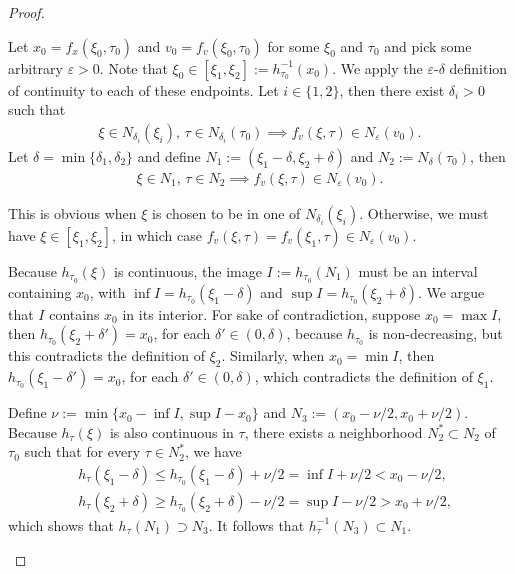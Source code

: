 \documentclass[a4paper]{article}
\theoremstyle{definition}
\theoremstyle{plain}
\begin{document}
\begin{proof}
\begin{outline}
  \2 Let $x_{0} = f_{x}(\xi_{0}, \tau_{0})$ and $v_{0} = f_{v}(\xi_{0}, \tau_{0})$ for
  some $\xi_{0}$ and $\tau_{0}$ and pick some arbitrary $\varepsilon > 0$. Note that
  $\xi_{0} \in [\xi_{1}, \xi_{2}] := h_{\tau_{0}}^{-1}(x_{0})$.
  We apply the $\varepsilon$-$\delta$ definition of continuity to each of these endpoints. Let
  $i \in \{1, 2\}$, then there exist $\delta_{i} > 0$ such that
  \begin{align}
  \xi \in N_{\delta_{i}}(\xi_{i}),\, \tau \in N_{\delta_{i}}(\tau_{0}) \implies
  f_{v}(\xi, \tau) \in N_{\varepsilon}(v_{0}).
  \end{align}
  Let $\delta = \min\{ \delta_{1}, \delta_{2} \}$ and define $N_{1} := (\xi_{1} - \delta, \xi_{2} + \delta)$
  and $N_{2} := N_{\delta}(\tau_{0})$, then
  \begin{align}
  \xi \in N_{1},\, \tau \in N_{2} \implies f_{v}(\xi, \tau) \in N_{\varepsilon}(v_{0}) .
  \end{align}

  This is obvious when $\xi$
  is chosen to be in one of $N_{\delta_{i}}(\xi_{i})$. Otherwise, we must have $\xi \in [\xi_{1}, \xi_{2}]$,
  in which case $f_{v}(\xi, \tau) = f_{v}(\xi_{1}, \tau) \in N_{\varepsilon}(v_{0})$.

  \2 Because $h_{\tau_{0}}(\xi)$ is continuous, the image $I := h_{\tau_{0}}(N_{1})$
  must be an interval containing $x_{0}$, with
  $\inf I = h_{\tau_{0}}(\xi_{1} - \delta)$ and
  $\sup I = h_{\tau_{0}}(\xi_{2} + \delta)$.
  We argue that $I$ contains $x_{0}$ in its interior. For sake of
  contradiction, suppose $x_{0} = \max I$, then $h_{\tau_{0}}(\xi_{2} + \delta') = x_{0}$,
  for each $\delta' \in (0, \delta)$, because $h_{\tau_{0}}$ is non-decreasing, but this
  contradicts the definition of $\xi_{2}$. Similarly, when $x_{0} = \min I$, then
  $h_{\tau_{0}}(\xi_{1} - \delta') = x_{0}$, for each $\delta' \in (0, \delta)$, which contradicts the
  definition of $\xi_{1}$.

  \2 Define $\nu := \min \{ x_{0} - \inf I, \sup I - x_{0}\}$ and
  $N_{3} := (x_{0} - \nu / 2, x_{0} + \nu / 2)$. Because $h_{\tau}(\xi)$ is also
  continuous in $\tau$, there exists a neighborhood $N_{2}^{*} \subset N_{2}$ of
  $\tau_{0}$ such that for every $\tau \in N_{2}^{*}$, we have
  \begin{align*}
  &h_{\tau}(\xi_{1} - \delta) \leq h_{\tau_{0}}(\xi_{1} - \delta) + \nu/2 = \inf I + \nu /2 < x_{0} - \nu/2 , \\
  &h_{\tau}(\xi_{2} + \delta) \geq h_{\tau_{0}}(\xi_{2} + \delta) - \nu/2 = \sup I - \nu /2 > x_{0} + \nu/2 ,
  \end{align*}
  which shows that $h_{\tau}(N_{1}) \supset N_{3}$. It follows that
  $h_{\tau}^{-1}(N_{3}) \subset N_{1}$.


\end{outline}
\end{proof}
\end{document}
